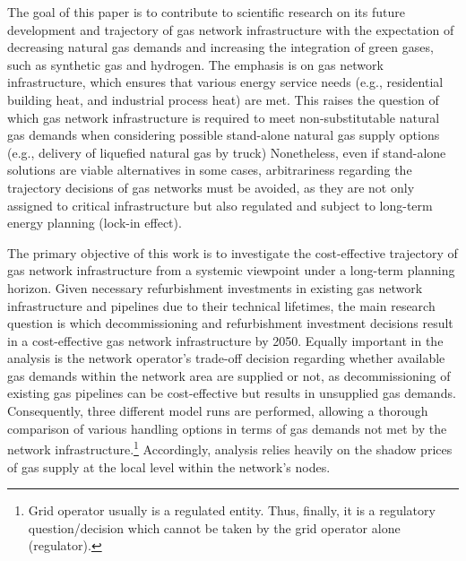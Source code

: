 The goal of this paper is to contribute to scientific research on its future development and trajectory of gas network infrastructure with the expectation of decreasing natural gas demands and increasing the integration of green gases, such as synthetic gas and hydrogen. The emphasis is on gas network infrastructure, which ensures that various energy service needs (e.g., residential building heat, and industrial process heat) are met. This raises the question of which gas network infrastructure is required to meet non-substitutable natural gas demands when considering possible stand-alone natural gas supply options (e.g., delivery of liquefied natural gas by truck)  Nonetheless, even if stand-alone solutions are viable alternatives in some cases, arbitrariness regarding the trajectory decisions of gas networks must be avoided, as they are not only assigned to critical infrastructure but also regulated and subject to long-term energy planning (lock-in effect).\vspace{0.35cm} 

The primary objective of this work is to investigate the cost-effective trajectory of gas network infrastructure from a systemic viewpoint under a long-term planning horizon. Given necessary refurbishment investments in existing gas network infrastructure and pipelines due to their technical lifetimes, the main research question is which decommissioning and refurbishment investment decisions result in a cost-effective gas network infrastructure by 2050. Equally important in the analysis is the network operator's trade-off decision regarding whether available gas demands within the network area are supplied or not, as decommissioning of existing gas pipelines can be cost-effective but results in unsupplied gas demands. Consequently, three different model runs are performed, allowing a thorough comparison of various handling options in terms of gas demands not met by the network infrastructure.\footnote{Grid operator usually is a regulated entity. Thus, finally, it is a regulatory question/decision which cannot be taken by the grid operator alone (regulator).} Accordingly, analysis relies heavily on the shadow prices of gas supply at the local level within the network's nodes. \vspace{0.35cm}

